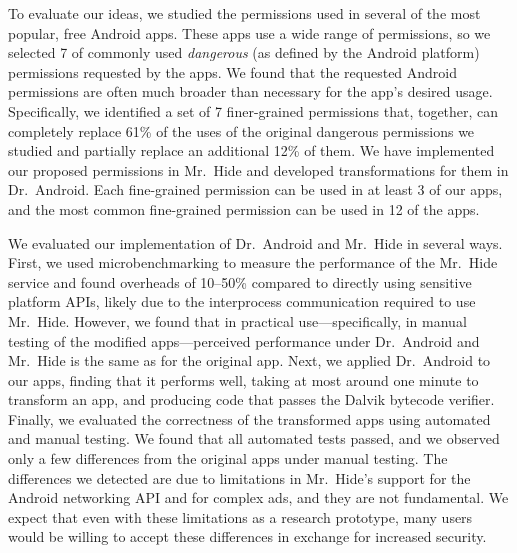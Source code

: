 \documentclass[preprint]{sig-alternate-10pt}
\newcommand{\lib}{Mr.\ Hide\xspace}
\newcommand{\rewriter}{Dr.\ Android\xspace}
\newcommand{\comment}[3][\color{red}]{}%
\newcommand{\tdm}[1]{\comment[\color{red}]{TDM}{#1}}
\newcommand{\jeff}[1]{\comment[\color{green}]{JSF}{#1}}
\begin{document}

To evaluate our ideas, we studied the permissions used in several of the
most popular, free Android apps. These apps use a
wide range of permissions, so we selected 7 of commonly used
\emph{dangerous} (as defined by the
Android platform) permissions requested by the
apps.  We found that 
the requested Android permissions are often much broader than
necessary for the app's desired usage.  Specifically, we identified a set of 7 finer-grained
permissions that, together, can completely replace 61\% of the
uses of the original dangerous permissions we studied and partially
replace an additional 12\% of them.  We have
implemented our proposed permissions in \lib and developed
transformations for them in \rewriter. Each fine-grained
permission can be used in at least 3 of our apps, and the most common
fine-grained permission can be used in 12 of the apps.

We evaluated our
implementation of \rewriter and \lib in several ways.  First, we used microbenchmarking to
measure the performance of the \lib service and found overheads of
10--50\% compared to directly using sensitive platform APIs, likely
due to the interprocess communication required to use \lib. However,
we found that in practical use---specifically, in manual testing of
the modified apps---perceived performance under \rewriter and \lib is
the same as for the original app. Next, we applied \rewriter to our
apps, finding that it performs well, taking at most around one minute
to transform an app, and producing code that passes the Dalvik bytecode
verifier. Finally, we evaluated the correctness of the transformed
apps using automated and manual testing. We found that all automated
tests passed, and we observed only a few differences from the
original apps 
 under manual testing. The differences we detected
are due to limitations in \lib's support for the Android
networking API and for complex ads, and they are not fundamental. We expect that even
with these limitations as a research prototype, many users would be
willing to accept these differences in exchange for increased security.
\end{document}
